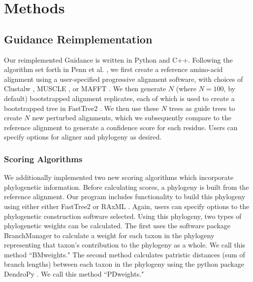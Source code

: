 \documentclass[10pt]{article}
\begin{document}
\section*{Methods}

\subsection*{Guidance Reimplementation}
Our reimplemented Guidance is written in Python and C++. Following the algorithm set forth in Penn et al. \citep{Penn2010}, we first create a reference amino-acid alignment using a user-specified progressive alignment software, with choices of Clustalw \citep{Thompson1994}, MUSCLE \citep{Edgar2004}, or MAFFT \citep{Katoh2002, Katoh2005}. We then generate $N$ (where $N=100$, by default) bootstrapped alignment replicates, each of which is used to create a bootstrapped tree in FastTree2 \citep{Price2010}. We then use these $N$ trees as guide trees to create $N$ new perturbed alignments, which we subsequently compare to the reference alignment to generate a confidence score for each residue. Users can specify options for aligner and phylogeny as desired.

\subsubsection*{Scoring Algorithms}
We additionally implemented two new scoring algorithms which incorporate phylogenetic information. Before calculating scores, a phylogeny is built from the reference alignment. Our program includes functionality to build this phylogeny using either either FastTree2 \citep{Price2010} or RAxML \citep{Stamatakis2006}. Again, users can specify options to the phylogenetic construction software selected. Using this phylogeny, two types of phylogenetic weights can be calculated. The first uses the software package BranchManager \citep{Stone2007} to calculate a weight for each taxon in the phylogeny representing that taxon's contribution to the phylogeny as a whole. We call this method ``BMweights." The second method calculates patristic distances (sum of branch lengths) between each taxon in the phylogeny using the python package DendroPy \citep{Sukumaran2010}. We call this method ``PDweights."
\end{document}
